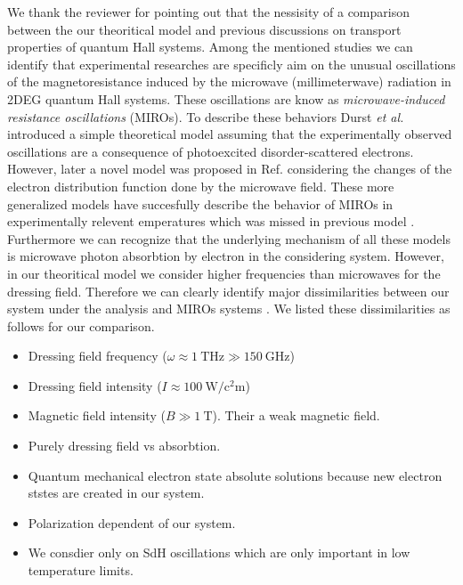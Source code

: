 \documentclass{article}
\begin{document}
We thank the reviewer for pointing out that the nessisity of a comparison between the our theoritical model and previous discussions on transport properties of quantum Hall systems.
Among the mentioned studies we can identify that experimental researches \cite{zudov01,mani02,zudov03,mani04} are specificly aim on the unusual oscillations of the magnetoresistance induced by the microwave (millimeterwave) radiation in 2DEG quantum Hall systems. These oscillations are know as \textit{microwave-induced resistance oscillations} (MIROs). To describe these behaviors Durst \textit{et al.} \cite{durst03} introduced a simple theoretical model assuming that the experimentally observed oscillations are a consequence of photoexcited disorder-scattered electrons.
However, later a novel model was proposed in Ref. \cite{dmitriev03,dmitriev05,dmitriev09} considering the changes of the electron distribution function done by the microwave field. These more generalized models \cite{dmitriev03,dmitriev05,dmitriev09} have succesfully describe the behavior of MIROs in experimentally relevent emperatures which was missed in previous model \cite{durst03}.
Furthermore we can recognize that the underlying mechanism of all these models \cite{durst03,dmitriev03,dmitriev05,dmitriev09} is microwave photon absorbtion by electron in the considering system. However, in our theoritical model we consider higher frequencies than microwaves for the dressing field. Therefore we can clearly identify major dissimilarities between our system under the analysis and MIROs systems \cite{durst03,dmitriev03,dmitriev05,dmitriev09}. We listed these dissimilarities as follows for our comparison.
\begin{itemize}
  \item
  Dressing field frequency ($\omega \approx \SI{1}{\tera\hertz} \gg \SI{150}{\giga\hertz}$)
  \item
  Dressing field intensity  ($I \approx \SI{100}{\watt\per\square\centi\metre}$)
  \item
  Magnetic field intensity ($B \gg \SI{1}{\tesla}$). Their a weak magnetic field.
  \item
  Purely dressing field vs absorbtion.
  \item
  Quantum mechanical electron state absolute solutions because new electron ststes are created in our system.
  \item
  Polarization dependent of our system.
  \item
  We consdier only on SdH oscillations which are only important in low temperature limits.
\end{itemize}
\end{document}
